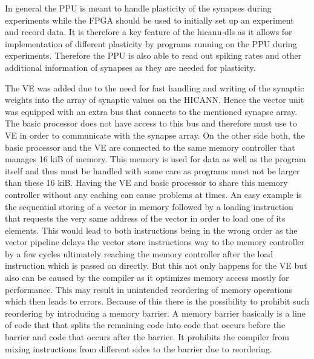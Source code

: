 In general the PPU is meant to handle plasticity of the synapses during experiments while the FPGA should be used to initially set up an experiment and record data.
It is therefore a key feature of the hicann-dls as it allows for implementation of different plasticity by programs running on the PPU during experiments.
Therefore the PPU is also able to read out spiking rates and other additional information of synapses as they are needed for plasticity.




The VE was added due to the need for fast handling and writing of the synaptic weights into the array of synaptic values on the HICANN.
Hence the vector unit was equipped with an extra bus that connects to the mentioned synapse array.
The basic processor does not have access to this bus and therefore must use to VE in order to communicate with the synapse array.
On the other side both, the basic processor and the VE are connected to the same memory controller that manages 16 kiB of memory.
This memory is used for data as well as the program itself and thus must be handled with some care as programs must not be larger than these 16 kiB.
Having the VE and basic processor to share this memory controller without any caching can cause problems at times.
An easy example is the sequential storing of a vector in memory followed by a loading instruction that requests the very same address of the vector in order to load one of its elements.
This would lead to both instructions being in the wrong order as the vector pipeline delays the vector store instructions way to the memory controller by a few cycles ultimately reaching the memory controller after the load instruction which is passed on directly.
But this not only happens for the VE but also can be caused by the compiler as it optimizes memory access mostly for performance.
This may result in unintended reordering of memory operations which then leads to errors.
Because of this there is the possibility to prohibit such reordering by introducing a memory barrier.
A memory barrier basically is a line of code that that splits the remaining code into code that occurs before the barrier and code that occurs after the barrier.
It prohibits the compiler from mixing instructions from different sides to the barrier due to reordering.
